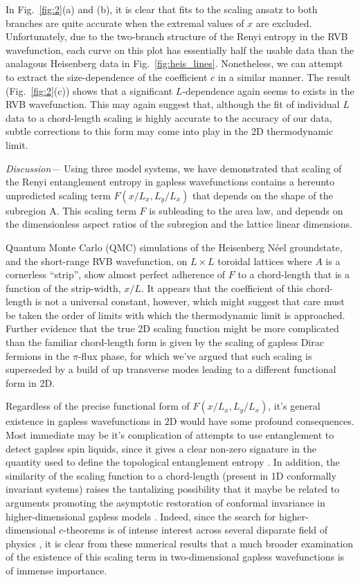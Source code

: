 \documentclass[prl,aps,twocolumn,floatfix,amsmath,amssymb,superscriptaddress,tightenlines]{revtex4}
\begin{document}
In Fig.~{\ref{fig:2}}(a) and (b), it is clear that fits to the scaling ansatz to both branches are quite accurate when the extremal values of $x$ are excluded.   Unfortunately, due to the two-branch structure of the Renyi entropy in the RVB wavefunction, each curve on this plot has essentially half the usable data than the analagous Heisenberg data in Fig.~\ref{fig:heis_lines}.  Nonetheless, we can attempt to extract the size-dependence of the coefficient $c$ in a similar manner.  The result (Fig.~\ref{fig:2}(c)) shows that a significant $L$-dependence again seems to exists in the RVB wavefunction.  This may again suggest that, although the fit of individual $L$ data to a chord-length scaling is highly accurate to the accuracy of our data, subtle corrections to this form may come into play in the 2D thermodynamic limit.

{\it Discussion---} Using three model systems, we have demonstrated that scaling of the Renyi entanglement entropy in gapless wavefunctions contains a hereunto unpredicted scaling term $F(x/L_x,L_y/L_x)$ that depends on the shape of the subregion A.  This scaling term $F$ is subleading to the area law, and depends on the dimensionless aspect ratios of the subregion and the lattice linear dimensions.

Quantum Monte Carlo (QMC) simulations of the Heisenberg N\'eel groundstate, and the short-range RVB wavefunction, on $L \times L$ toroidal lattices where $A$ is a cornerless ``strip'', show almost perfect adherence of $F$ to a chord-length that is a function of the strip-width, $x/L$.
It appears that the coefficient of this chord-length is not a universal constant, however, which might suggest that care must be taken the order of limits with which the thermodynamic limit is approached.  Further evidence that the true 2D scaling function might be more complicated than the familiar chord-length form is given by the scaling of gapless Dirac fermions in the $\pi$-flux phase, for which we've argued that such scaling is superseded by a build of up transverse modes leading to a different functional form in 2D.

Regardless of the precise functional form of $F(x/L_x,L_y/L_x)$, it's general existence in gapless wavefunctions in 2D would have some profound consequences.  Most immediate may be it's complication of attempts to use entanglement to detect gapless spin liquids,
since it gives a clear non-zero signature in the quantity used to define the topological entanglement entropy \cite{KP,LW}.
In addition, the similarity of the scaling function to a chord-length (present in 1D conformally invariant systems) 
raises the tantalizing possibility that it maybe be related to arguments promoting the asymptotic restoration of conformal invariance in higher-dimensional gapless models \cite{Shredder}.  
Indeed, since the search for higher-dimensional $c$-theorems is of intense interest across several disparate field of physics \cite{Zamo,ryu,Myers},
it is clear from these numerical results that a much broader examination of the existence of this scaling term in two-dimensional gapless 
wavefunctions is of immense importance.
\end{document}
